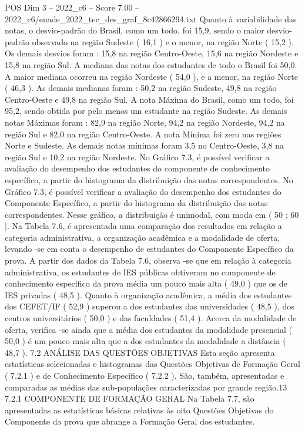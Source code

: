 \begin{textsample}{POS Dim 3 – 2022\_c6 – Score 7.00 – 2022\_c6/enade\_2022\_tec\_des\_graf\_8c42866294.txt}
Quanto à variabilidade das notas, o desvio-padrão do Brasil, como um todo, foi 15,9, sendo o maior desvio-padrão observado na região Sudeste ( 16,1 ) e o menor, na região Norte ( 15,2 ).
Os demais desvios foram : 15,8 na região Centro-Oeste, 15,6 na região Nordeste e 15,8 na região Sul.
A mediana das notas dos estudantes de todo o Brasil foi 50,0.
A maior mediana ocorreu na região Nordeste ( 54,0 ), e a menor, na região Norte ( 46,3 ).
As demais medianas foram : 50,2 na região Sudeste, 49,8 na região Centro-Oeste e 49,8 na região Sul.
A nota Máxima do Brasil, como um todo, foi 95,2, sendo obtida por pelo menos um estudante na região Sudeste.
As demais notas Máximas foram : 82,9 na região Norte, 94,2 na região Nordeste, 94,2 na região Sul e 82,0 na região Centro-Oeste.
A nota Mínima foi zero nas regiões Norte e Sudeste.
As demais notas mínimas foram 3,5 no Centro-Oeste, 3,8 na região Sul e 10,2 na região Nordeste.
No Gráfico 7.3, é possível verificar a avaliação do desempenho dos estudantes do componente de conhecimento específico, a partir do histograma da distribuição das notas correspondentes.
No Gráfico 7.3, é possível verificar a avaliação do desempenho dos estudantes do Componente Específico, a partir do histograma da distribuição das notas correspondentes.
Nesse gráfico, a distribuição é unimodal, com moda em ( 50 ; 60 ].
Na Tabela 7.6, é apresentada uma comparação dos resultados em relação a categoria administrativa, a organização acadêmica e a modalidade de oferta, levando -se em conta o desempenho de estudantes do Componente Específico da prova.
A partir dos dados da Tabela 7.6, observa -se que em relação à categoria administrativa, os estudantes de IES públicas obtiveram no componente de conhecimento específico da prova média um pouco mais alta ( 49,0 ) que os de IES privadas ( 48,5 ).
Quanto à organização acadêmica, a média dos estudantes dos CEFET/IF ( 52,9 ) superou a dos estudantes das universidades ( 48,5 ), dos centros universitários ( 50,0 ) e das faculdades ( 51,4 ).
Acerca da modalidade de oferta, verifica -se ainda que a média dos estudantes da modalidade presencial ( 50,0 ) é um pouco mais alta que a dos estudantes da modalidade a distância ( 48,7 ). 7.2 ANÁLISE DAS QUESTÕES OBJETIVAS Esta seção apresenta estatísticas selecionadas e histogramas das Questões Objetivas de Formação Geral ( 7.2.1 ) e de Conhecimento Específico ( 7.2.2 ).
São, também, apresentadas e comparadas as médias das sub-populações caracterizadas por grande região.13 7.2.1 COMPONENTE DE FORMAÇÃO GERAL Na Tabela 7.7, são apresentadas as estatísticas básicas relativas às oito Questões Objetivas do Componente da prova que abrange a Formação Geral dos estudantes.

\end{textsample}
